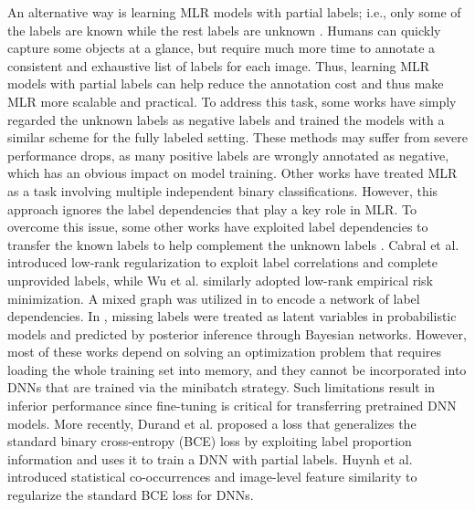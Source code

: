 An alternative way is learning MLR models with partial labels; i.e., only some of the labels are known while the rest labels are unknown \cite{durand2019learning,huynh2020interactive,sun2017revisiting,joulin2016learning,tsoumakas2007multi}. Humans can quickly capture some objects at a glance, but require much more time to annotate a consistent and exhaustive list of labels for each image. Thus, learning MLR models with partial labels can help reduce the annotation cost and thus make MLR more scalable and practical. To address this task, some works \cite{bucak2011multi,wang2014binary,sun2010multi,sun2017revisiting} have simply regarded the unknown labels as negative labels and trained the models with a similar scheme for the fully labeled setting. These methods may suffer from severe performance drops, as many positive labels are wrongly annotated as negative, which has an obvious impact on model training. Other works \cite{tsoumakas2007multi} have treated MLR as a task involving multiple independent binary classifications. However, this approach ignores the label dependencies that play a key role in MLR. To overcome this issue, some other works have exploited label dependencies to transfer the known labels to help complement the unknown labels \cite{xu2013speedup,cabral2011matrix,yu2014large,wu2015ml,KapoorVJ12nips}. Cabral et al. \cite{cabral2011matrix} introduced low-rank regularization to exploit label correlations and complete unprovided labels, while Wu et al. \cite{wu2015ml} similarly adopted low-rank empirical risk minimization. A mixed graph was utilized in \cite{WuLG15iccv} to encode a network of label dependencies. In \cite{KapoorVJ12nips}, missing labels were treated as latent variables in probabilistic models and predicted by posterior inference through Bayesian networks. However, most of these works depend on solving an optimization problem that requires loading the whole training set into memory, and they cannot be incorporated into DNNs \cite{simonyan2015very,he2016deep} that are trained via the minibatch strategy. Such limitations result in inferior performance since fine-tuning is critical for transferring pretrained DNN models. More recently, Durand et al. \cite{durand2019learning} proposed a loss that generalizes the standard binary cross-entropy (BCE) loss by exploiting label proportion information and uses it to train a DNN \cite{he2016deep} with partial labels. Huynh et al. \cite{huynh2020interactive} introduced statistical co-occurrences and image-level feature similarity to regularize the standard BCE loss for DNNs.

